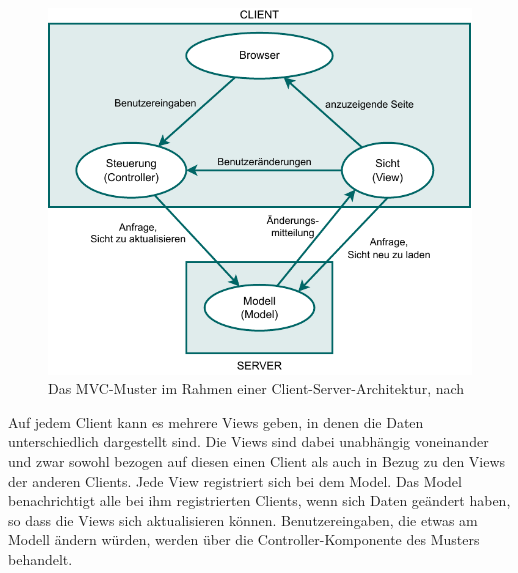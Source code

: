 \begin{figure}[h!]
	\centering
	\includegraphics{Bilder/Kapitel-7/mvc_muster.pdf}
	\caption[Das MVC-Muster im Rahmen einer Client-Server-Architektur]{Das MVC-Muster im Rahmen einer Client-Server-Architektur, nach \cite[115]{som20}}
	\label{fig:mvc_muster}
\end{figure}

Auf jedem Client kann es mehrere Views geben, in denen die Daten unterschiedlich dargestellt sind. Die Views sind dabei unabhängig voneinander und zwar sowohl bezogen auf diesen einen Client als auch in Bezug zu den Views der anderen Clients. Jede View registriert sich bei dem Model. Das Model benachrichtigt alle bei ihm registrierten Clients, wenn sich Daten geändert haben, so dass die Views sich aktualisieren können. Benutzereingaben, die etwas am Modell ändern würden, werden über die Controller-Komponente des Musters behandelt.
